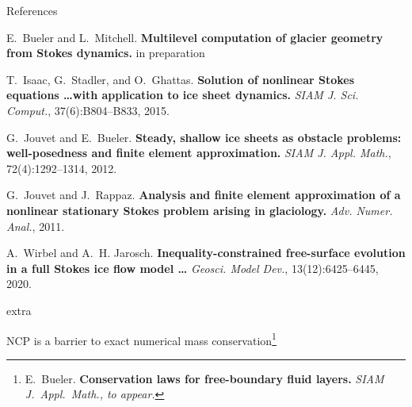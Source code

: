 \documentclass[usepdftitle=false]{beamer}
\begin{document}


\appendix

\begin{frame}{References}
%
%

\begin{thebibliography}{1}
E.~Bueler and L.~Mitchell. \textbf{Multilevel computation of glacier geometry from Stokes dynamics.} in preparation

T.~Isaac, G.~Stadler, and O.~Ghattas.  \textbf{Solution of nonlinear Stokes equations \dots with application to ice sheet dynamics.} {\em SIAM J. Sci. Comput.}, 37(6):B804--B833, 2015.

G.~Jouvet and E.~Bueler. \textbf{Steady, shallow ice sheets as obstacle problems: well-posedness and finite element approximation.} {\em SIAM J. Appl. Math.}, 72(4):1292--1314, 2012.

G.~Jouvet and J.~Rappaz. \textbf{Analysis and finite element approximation of a nonlinear stationary Stokes problem arising in glaciology.} {\em Adv. Numer. Anal.}, 2011.

A.~Wirbel and A.~H. Jarosch. \textbf{Inequality-constrained free-surface evolution in a full {S}tokes ice flow model \dots} {\em Geosci. Model Dev.}, 13(12):6425--6445, 2020.
\end{thebibliography}
\end{frame}

\begin{frame}{extra}

NCP is a barrier to exact numerical mass conservation\footnote{E.~Bueler. \textbf{Conservation laws for free-boundary fluid layers.} \em{SIAM J.~Appl.~Math.}, to appear.}
\end{frame}
\end{document}

